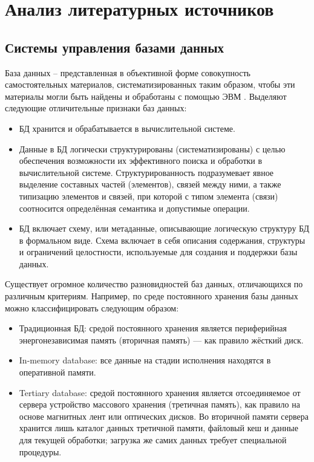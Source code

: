\section{Анализ литературных источников}
\label{sec:literature_analysis}

\subsection{Системы управления базами данных}

База данных -- представленная в объективной форме совокупность самостоятельных материалов, систематизированных таким образом, чтобы эти материалы могли быть найдены и обработаны с помощью ЭВМ \cite{wiki_db}. Выделяют следующие отличительные признаки баз данных:
\begin{itemize}
	\item БД хранится и обрабатывается в вычислительной системе.
	\item Данные в БД логически структурированы (систематизированы) с целью обеспечения возможности их эффективного поиска и обработки в вычислительной системе. Структурированность подразумевает явное выделение составных частей (элементов), связей между ними, а также типизацию элементов и связей, при которой с типом элемента (связи) соотносится определённая семантика и допустимые операции.
	\item БД включает схему, или метаданные, описывающие логическую структуру БД в формальном виде. Схема включает в себя описания содержания, структуры и ограничений целостности, используемые для создания и поддержки базы данных.
\end{itemize}

Существует огромное количество разновидностей баз данных, отличающихся по различным критериям. Например, по среде постоянного хранения базы данных можно классифицировать следующим образом:
\begin{itemize}
	\item Традиционная БД: средой постоянного хранения является периферийная энергонезависимая память (вторичная память) — как правило жёсткий диск.
	\item In-memory database: все данные на стадии исполнения находятся в оперативной памяти.
	\item Tertiary database: средой постоянного хранения является отсоединяемое от сервера устройство массового хранения (третичная память), как правило на основе магнитных лент или оптических дисков. Во вторичной памяти сервера хранится лишь каталог данных третичной памяти, файловый кеш и данные для текущей обработки; загрузка же самих данных требует специальной процедуры.
\end{itemize}

